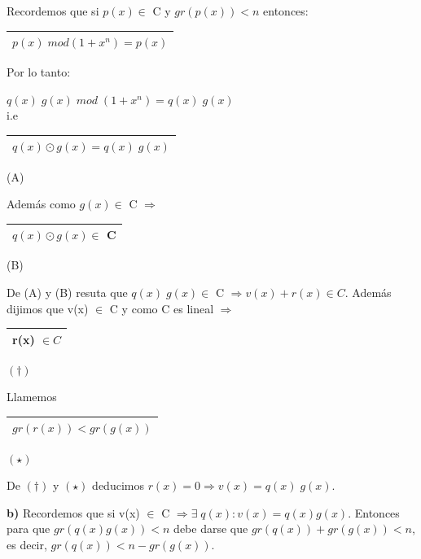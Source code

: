 \documentclass[12pt,a4paper]{report}
\begin{document}
			\vspace{3mm}
			\par Recordemos que si $p(x) \in$ C y $gr(p(x)) < n$ entonces: \begin{tabular}{|c|} \hline $p(x) \; mod (1+ x^{n}) = p(x)$ \\\hline \end{tabular}

			\vspace{3mm}
			\par Por lo tanto:
			\begin{center}
				$ q(x) \; g(x) \; mod \; (1 + x^{n}) = q(x) \; g(x) $ \\
				\vspace{3mm}
				i.e \begin{tabular}{|c|} \hline $ q(x) \odot g(x) = q(x) \; g(x) $ \\\hline \end{tabular} (A)
			\end{center}
			\par Además como $g(x) \in$ C $\Rightarrow$ \begin{tabular}{|c|} \hline $q(x) \odot g(x) \in$ C \\ \hline \end{tabular} (B)

			\vspace{3mm}
			\par De (A) y (B) resuta que $q(x) \; g(x) \in$ C $\Rightarrow v(x) + r(x) \in C$. Además dijimos que v(x) $\in$ C y como C es lineal $\Rightarrow$ \begin{tabular}{|c|} \hline r(x) $\in C$ \\\hline \end{tabular} $(\dag)$
			\vspace{3mm}
			\par Llamemos \begin{tabular}{|c|} \hline $gr(r(x)) < gr(g(x))$ \\ \hline \end{tabular} $(\star)$

			\vspace{5mm}
			\par De $(\dag)$ y $(\star)$ deducimos $r(x) = 0 \Rightarrow v(x) = q(x) \; g(x)$.

			\vspace{5mm}
			\textbf{b)} Recordemos que si v(x) $\in$ C $\Rightarrow \exists \; q(x) : v(x) = q(x) g(x)$. Entonces para que $gr(q(x) g(x)) < n$ debe darse que $gr(q(x)) + gr(g(x)) < n$, es decir, $gr(q(x)) < n - gr(g(x))$.
\end{document}
